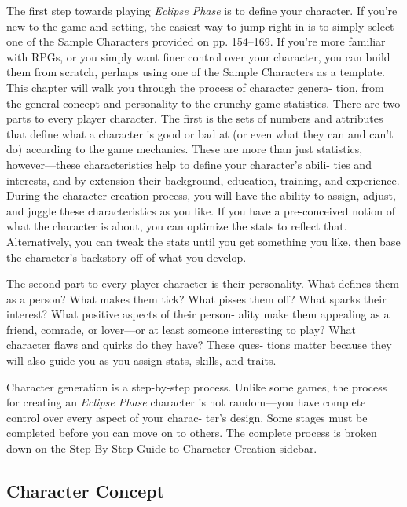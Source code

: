 The first step towards playing \textit{Eclipse Phase }is to 
define your character. If you're new to the game and 
setting, the easiest way to jump right in is to simply 
select one of the Sample Characters provided on pp. 
154–169. If you're more familiar with RPGs, or you 
simply want finer control over your character, you 
can build them from scratch, perhaps using one of the 
Sample Characters as a template. This chapter will 
walk you through the process of character genera-
tion, from the general concept and personality to the 
crunchy game statistics.
There are two parts to every player character. The 
first is the sets of numbers and attributes that define 
what a character is good or bad at (or even what they 
can and can't do) according to the game mechanics. 
These are more than just statistics, however—these 
characteristics help to define your character's abili-
ties and interests, and by extension their background, 
education, training, and experience. During the 
character creation process, you will have the ability 
to assign, adjust, and juggle these characteristics as 
you like. If you have a pre-conceived notion of what 
the character is about, you can optimize the stats to 
reflect that. Alternatively, you can tweak the stats until 
you get something you like, then base the character's 
backstory off of what you develop.

The second part to every player character is their 
personality. What defines them as a person? What 
makes them tick? What pisses them off? What sparks 
their interest? What positive aspects of their person-
ality make them appealing as a friend, comrade, or 
lover—or at least someone interesting to play? What 
character flaws and quirks do they have? These ques-
tions matter because they will also guide you as you 
assign stats, skills, and traits.

Character generation is a step-by-step process. 
Unlike some games, the process for creating an 
\textit{Eclipse Phase} character is not random—you have 
complete control over every aspect of your charac-
ter's design. Some stages must be completed before 
you can move on to others. The complete process is 
broken down on the Step-By-Step Guide to Character 
Creation sidebar.

\subsection{Character Concept}

